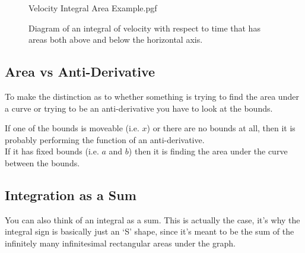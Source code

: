 \documentclass[main.tex]{subfiles}
\begin{document}
                \begin{figure}[h]
                    \centering
                    \scalebox{0.7}
                    {
                        \begin{adjustbox}{clip,trim=20mm 15mm 10mm 10mm}
                            {{Velocity Integral Area Example.pgf}}
                        \end{adjustbox}
                    }
                    \caption{Diagram of an integral of velocity with respect to time that has areas both above and below the horizontal axis.}
                    \label{fig: Velocity Integral Area Example}
                \end{figure}
            \newpage

            

            \subsection{Area vs Anti-Derivative}
                \label{subsec: Area vs Anti-Derivative}

                To make the distinction as to whether something is trying to find the area under a curve or trying to be an anti-derivative you have to look at the bounds.
                
                If one of the bounds is moveable (i.e. $x$) or there are no bounds at all, then it is probably performing the function of an anti-derivative.\\
                If it has fixed bounds (i.e. $a$ and $b$) then it is finding the area under the curve between the bounds.

            
            \subsection{Integration as a Sum}
                \label{subsec: Integration as a Sum}

                You can also think of an integral as a sum. This is actually the case, it's why the integral sign is basically just an `S' shape, since it's meant to be the sum of the infinitely many infinitesimal rectangular areas under the graph.
\end{document}
